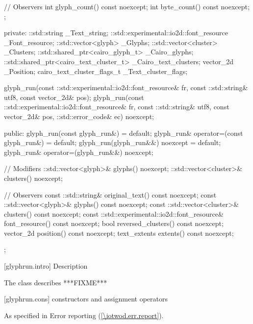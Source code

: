 \begin{codeblock}
{{{{{{      // Observers
      int glyph_count() const noexcept;
      int byte_count() const noexcept;
    };

  private:
    ::std::string _Text_string;
    ::std::experimental::io2d::font_resource _Font_resource;
    ::std::vector<glyph> _Glyphs;
    ::std::vector<cluster> _Clusters;
    ::std::shared_ptr<cairo_glyph_t> _Cairo_glyphs;
    ::std::shared_ptr<cairo_text_cluster_t> _Cairo_text_clusters;
    vector_2d _Position;
    cairo_text_cluster_flags_t _Text_cluster_flags;

    glyph_run(const ::std::experimental::io2d::font_resource& fr, const ::std::string& utf8, const vector_2d& pos);
    glyph_run(const ::std::experimental::io2d::font_resource& fr, const ::std::string& utf8, const vector_2d& pos, ::std::error_code& ec) noexcept;

  public:
    glyph_run(const glyph_run&) = default;
    glyph_run& operator=(const glyph_run&) = default;
    glyph_run(glyph_run&&) noexcept = default;
    glyph_run& operator=(glyph_run&&) noexcept;

    // Modifiers
    ::std::vector<glyph>& glyphs() noexcept;
    ::std::vector<cluster>& clusters() noexcept;

    // Observers
    const ::std::string& original_text() const noexcept;
    const ::std::vector<glyph>& glyphs() const noexcept;
    const ::std::vector<cluster>& clusters() const noexcept;
    const ::std::experimental::io2d::font_resource& font_resource() const noexcept;
    bool reversed_clusters() const noexcept;
    vector_2d position() const noexcept;
    text_extents extents() const noexcept;
  };
} } } }
\end{codeblock}

 [glyphrun.intro] { Description}

\pnum
{}
The  class describes ***FIXME***

 [glyphrun.cons] { constructors and assignment operators}

\begin{itemdecl}
\end{itemdecl}
\begin{itemdescr}
\pnum
\effects

\pnum
\throws
As specified in Error reporting (\ref{\iotwod.err.report}).

\pnum
\remarks

\pnum
\errors

\pnum
\realnotes

\end{itemdescr}


